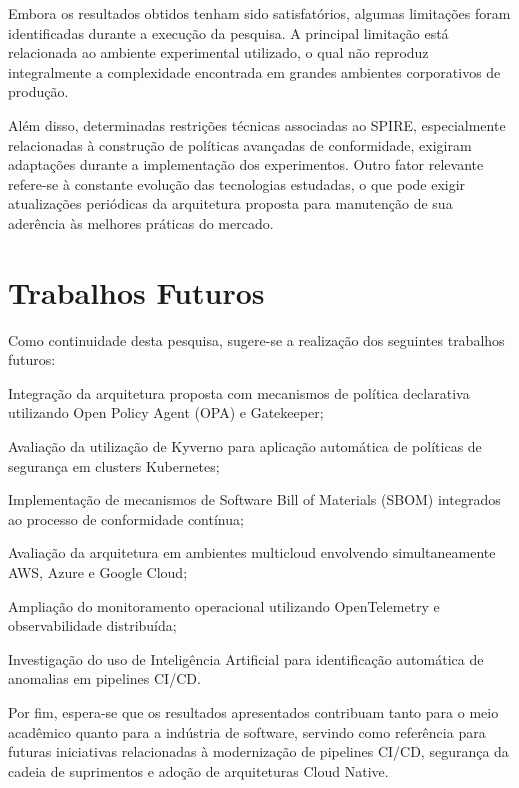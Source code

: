 Embora os resultados obtidos tenham sido satisfatórios, algumas limitações foram identificadas durante a execução da pesquisa. A principal limitação está relacionada ao ambiente experimental utilizado, o qual não reproduz integralmente a complexidade encontrada em grandes ambientes corporativos de produção.

Além disso, determinadas restrições técnicas associadas ao SPIRE, especialmente relacionadas à construção de políticas avançadas de conformidade, exigiram adaptações durante a implementação dos experimentos. Outro fator relevante refere-se à constante evolução das tecnologias estudadas, o que pode exigir atualizações periódicas da arquitetura proposta para manutenção de sua aderência às melhores práticas do mercado.

\section{Trabalhos Futuros}
\label{sec:trabalhos-futuros}

Como continuidade desta pesquisa, sugere-se a realização dos seguintes trabalhos futuros:

\begin{alineas}
    \item Integração da arquitetura proposta com mecanismos de política declarativa utilizando Open Policy Agent (OPA) e Gatekeeper;
    \item Avaliação da utilização de Kyverno para aplicação automática de políticas de segurança em clusters Kubernetes;
    \item Implementação de mecanismos de Software Bill of Materials (SBOM) integrados ao processo de conformidade contínua;
    \item Avaliação da arquitetura em ambientes multicloud envolvendo simultaneamente AWS, Azure e Google Cloud;
    \item Ampliação do monitoramento operacional utilizando OpenTelemetry e observabilidade distribuída;
    \item Investigação do uso de Inteligência Artificial para identificação automática de anomalias em pipelines CI/CD.
\end{alineas}

Por fim, espera-se que os resultados apresentados contribuam tanto para o meio acadêmico quanto para a indústria de software, servindo como referência para futuras iniciativas relacionadas à modernização de pipelines CI/CD, segurança da cadeia de suprimentos e adoção de arquiteturas Cloud Native.
